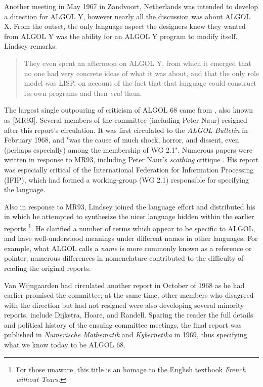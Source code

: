 Another meeting in May 1967 in Zandvoort, Netherlands was intended to develop a direction for ALGOL Y,
however nearly all the discussion was about ALGOL X.
From the outset, the only language aspect the designers knew they wanted from ALGOL Y
was the ability for an ALGOL Y program to modify itself.
Lindsey remarks:

\begin{quotation}
	They even spent an afternoon on ALGOL Y, from which it emerged that no one had
	very concrete ideas of what it was about, and that the only role model was
	LISP, on account of the fact that that language could construct its own
	programs and then \textit{eval} them.
\end{quotation}

The largest single outpouring of criticism of ALGOL 68 came from
, also known as [MR93].
Several members of the committee (including Peter Naur) resigned
after this report's circulation.
It was first circulated to the \textit{ALGOL Bulletin} in February 1968,
and "was the cause of much shock, horror, and dissent, even
(perhaps especially) among the membership of WG 2.1"\cite{a_history_of_algol_68_1993}.
Numerous papers were written in response to MR93, including Peter Naur's \textit{scathing}
critique .
His report was especially critical of the International Federation for Information Processing
(IFIP), which had formed a working-group (WG 2.1) responsible for specifying the language.

Also in response to MR93, Lindsey joined the language effort and
distributed his 
in which he attempted to synthesize the nicer language hidden within the earlier reports
\footnote{For those unaware, this title is an homage to the English textbook \textit{French without Tears}.}.
He clarified a number of terms which appear to be specific to ALGOL, and
have well-understood meanings under different names in other languages.
For example, what ALGOL calls a \textit{name} is more commonly known as a reference or pointer;
numerous differences in nomenclature contributed to the difficulty of reading
the original reports.

Van Wijngaarden had circulated another
report\cite{penultimate_draft_report_on_algol_68_1968} in October of 1968 as he
had earlier promised the committee; at the same time, other members who
disagreed with the direction but had not resigned were also developing several
minority reports, include Dijkstra, Hoare, and Randell.
Sparing the reader the full details and political history of the ensuing committee
meetings, the final report 
was published in \textit{Numerische Mathematik} and \textit{Kybernetika}
in 1969, thus specifying what we know today to be ALGOL 68.


